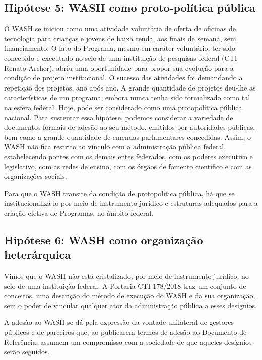 \subsection[Hipótese 5: WASH como proto-política pública]{Hipótese 5: WASH como proto-política pública}\label{Hipótese 5: WASH como proto-política pública}
O WASH se iniciou como uma atividade voluntária de oferta de oficinas de tecnologia para crianças e jovens de baixa renda, aos finais de semana,  sem financiamento. O fato do Programa, mesmo em caráter voluntário, ter sido concebido e executado no seio de uma instituição de pesquisas federal (CTI Renato Archer), abriu uma oportunidade para propor sua evolução para a condição de projeto institucional. O sucesso das atividades foi demandando a repetição dos projetos, ano após ano. A grande quantidade de projetos deu-lhe as características de um programa, embora nunca tenha sido formalizado como tal na esfera federal.  Hoje, pode ser considerado como uma protopolítica pública nacional. Para sustentar essa hipótese, podemos considerar a variedade de documentos formais de adesão ao seu método, emitidos por autoridades públicas, bem como a grande quantidade de emendas parlamentares concedidas. Assim, o WASH não fica restrito ao vínculo com a administração pública federal, estabelecendo pontes com os demais entes federados, com os poderes executivo e legislativo, com as redes de ensino, com os órgãos de fomento científico e com as organizações sociais.

Para que o WASH transite da condição de protopolítica pública, há que se institucionalizá-lo por meio de instrumento jurídico e estruturas  adequados para a criação efetiva de Programas, no âmbito federal.

\subsection[Hipótese 6: WASH como organização heterárquica]{Hipótese 6: WASH como organização heterárquica}\label{Hipótese 6: WASH como organização heterárquica}
Vimos que o WASH não está cristalizado, por meio de instrumento jurídico, no seio de uma instituição federal. A Portaria CTI 178/2018 traz um conjunto de conceitos, uma descrição do método de execução do WASH e da sua organização, sem o poder de vincular qualquer ator da administração pública a esses desígnios.

A adesão ao WASH se dá pela expressão da vontade unilateral de gestores públicos e de parceiros que, ao publicarem termos de adesão ao Documento de Referência, assumem um compromisso com a sociedade de que aqueles desígnios serão seguidos.

